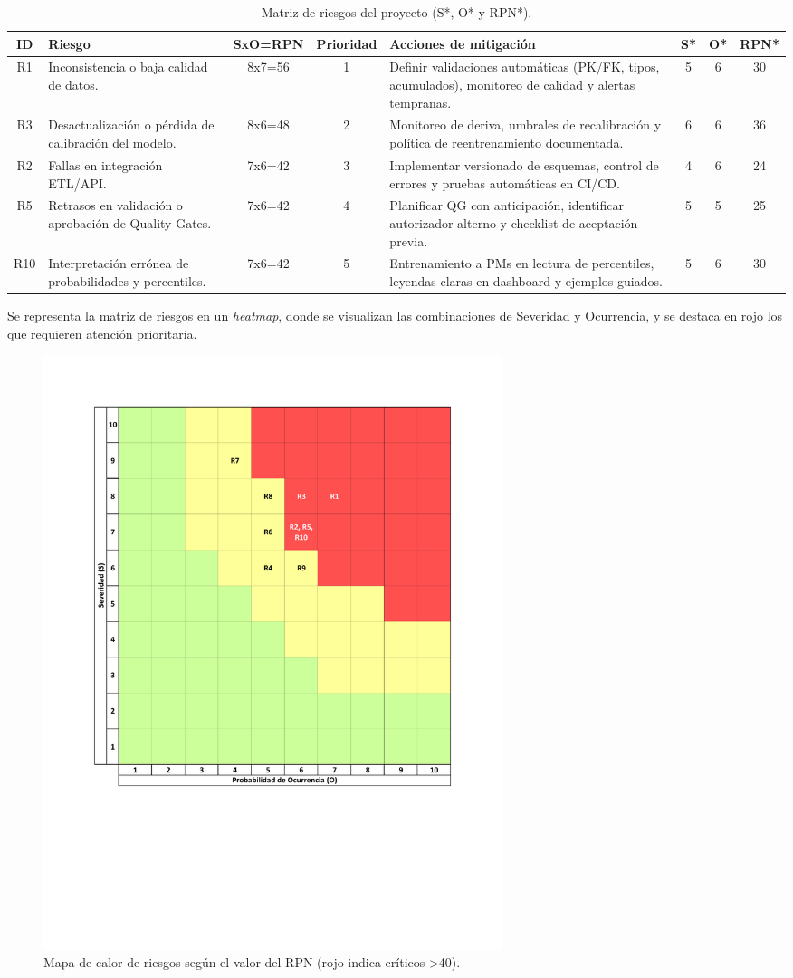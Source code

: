 \documentclass[12pt]
{charter}
\begin{document}
\begin{table}[ht]
\centering
\scriptsize
\caption{Matriz de riesgos del proyecto (S*, O* y RPN*).}
\label{tab:riesgos-RPN-residual}
\begin{tabularx}{\textwidth}{cXccXccc}
\toprule
\textbf{ID} & \textbf{Riesgo} & \textbf{SxO=RPN} & \textbf{Prioridad} & \textbf{Acciones de mitigación} & \textbf{S*} & \textbf{O*} & \textbf{RPN*}  \\
\midrule
R1 & Inconsistencia o baja calidad de datos. & 8x7=56 & 1 &
Definir validaciones automáticas (PK/FK, tipos, acumulados), monitoreo de calidad y alertas tempranas. & 5 & 6 & 30 \\
R3 & Desactualización o pérdida de calibración del modelo. & 8x6=48 & 2 &
Monitoreo de deriva, umbrales de recalibración y política de reentrenamiento documentada. & 6 & 6 & 36 \\
R2 & Fallas en integración ETL/API. & 7x6=42 & 3 & 
Implementar versionado de esquemas, control de errores y pruebas automáticas en CI/CD. & 4 & 6 & 24 \\
R5 & Retrasos en validación o aprobación de Quality Gates. & 7x6=42 & 4 &
Planificar QG con anticipación, identificar autorizador alterno y checklist de aceptación previa. & 5 & 5 & 25 \\
R10 & Interpretación errónea de probabilidades y percentiles. & 7x6=42 & 5 &
Entrenamiento a PMs en lectura de percentiles, leyendas claras en dashboard y ejemplos guiados. & 5 & 6 & 30 \\
\bottomrule
\end{tabularx}
\end{table}

Se representa la matriz de riesgos en un \textit{heatmap}, donde se visualizan las combinaciones de Severidad y Ocurrencia, y se destaca en rojo los que requieren atención prioritaria.

\begin{figure}[H]
  \centering
  \includegraphics[trim=65 213 65 65,clip,width=0.65\textwidth]{Figuras/TF_Heatmap_Risk.pdf}
  \caption{Mapa de calor de riesgos según el valor del RPN (rojo indica críticos >40).}
  \label{fig:TF_Heatmap_Risk}
\end{figure}
\FloatBarrier
\end{document}
